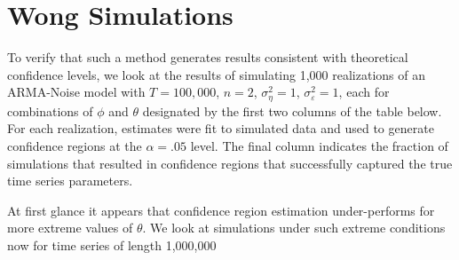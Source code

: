 \section{Wong Simulations}






To verify that such a method generates results consistent with theoretical confidence levels, we look at the results of simulating 1,000 realizations of an ARMA-Noise model with $T = 100,000$, $n = 2$, $\sigma_\eta^2 = 1$, $\sigma_\varepsilon^2 = 1$, each for combinations of $\phi$ and $\theta$ designated by the first two columns of the table below. For each realization, estimates were fit to simulated data and used to generate confidence regions at the $\alpha = .05$ level. The final column indicates the fraction of simulations that resulted in confidence regions that successfully captured the true time series parameters.


At first glance it appears that confidence region estimation under-performs for more extreme values of $\theta$. We look at simulations under such extreme conditions now for time series of length 1,000,000